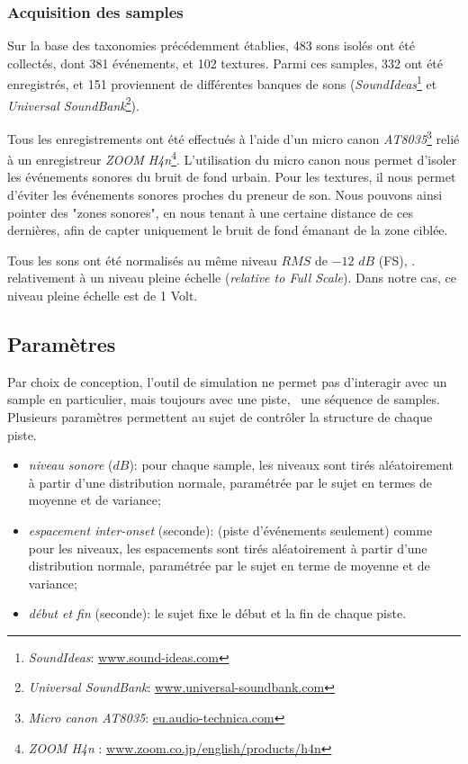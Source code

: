 \documentclass[twoside,twocolumn]{article}
\begin{document}
\subsubsection*{Acquisition des samples}

Sur la base des taxonomies précédemment établies, 483 sons isolés ont été collectés, dont 381 événements, et 102 textures. Parmi ces samples, 332 ont été enregistrés, et 151 proviennent de différentes banques de sons (\emph{SoundIdeas}\footnote{\emph{SoundIdeas}: \url{www.sound-ideas.com}} et \emph{Universal SoundBank}\footnote{\emph{Universal SoundBank}: \url{www.universal-soundbank.com}}).

Tous les enregistrements ont été effectués à l’aide d'un micro canon \emph{AT8035}\footnote{\emph{Micro canon AT8035}: \url{eu.audio-technica.com}} relié à un enregistreur \emph{ZOOM H4n}\footnote{\emph{ZOOM H4n} : \url{www.zoom.co.jp/english/products/h4n}}. L’utilisation du micro canon nous permet d’isoler les événements sonores du bruit de fond urbain. Pour les textures, il nous permet d’éviter les événements sonores proches du preneur de son. Nous pouvons ainsi pointer des "zones sonores", en nous tenant à une certaine distance de ces dernières, afin de capter uniquement le bruit de fond émanant de la zone ciblée.

Tous les sons ont été normalisés au même niveau $RMS$ de $-12$ $dB$ (FS), \ie. relativement à un niveau pleine échelle (\emph{relative to Full Scale}). Dans notre cas, ce niveau pleine échelle est de 1 Volt.

\subsection{Paramètres}
\label{sec:simscene_parametre}

Par choix de conception, l'outil de simulation ne permet pas d’interagir avec un sample en particulier, mais toujours avec une piste, \ie~une séquence de samples. Plusieurs paramètres permettent au sujet de contrôler la structure de chaque piste.

\begin{itemize}
\item \emph{niveau sonore} ($dB$): pour chaque sample, les niveaux sont tirés aléatoirement à partir d'une distribution normale, paramétrée par le sujet en termes de moyenne et de variance;
\item \emph{espacement inter-onset} (seconde): (piste d'événements seulement) comme pour les niveaux, les espacements sont tirés aléatoirement à partir d'une distribution normale, paramétrée par le sujet en terme de moyenne et de variance;
\item \emph{début et fin} (seconde): le sujet fixe le début et la fin de chaque piste.
\end{itemize}
\end{document}
